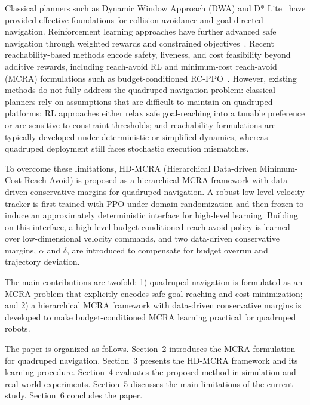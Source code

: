 \documentclass{article}
\begin{document}
Classical planners such as Dynamic Window Approach (DWA) and D* Lite~\citep{fox1997,koenig2002,karaman2011} have provided effective foundations for collision avoidance and goal-directed navigation. Reinforcement learning approaches have further advanced safe navigation through weighted rewards and constrained objectives~\citep{achiam2017,tessler2019,liu2022cvpo,garcia2015,wachi2024,guerrier2024}. Recent reachability-based methods encode safety, liveness, and cost feasibility beyond additive rewards, including reach-avoid RL and minimum-cost reach-avoid (MCRA) formulations such as budget-conditioned RC-PPO~\citep{bansal2017,hsu2021,so2024,ganai2024survey,ganai2023}. However, existing methods do not fully address the quadruped navigation problem: classical planners rely on assumptions that are difficult to maintain on quadruped platforms; RL approaches either relax safe goal-reaching into a tunable preference or are sensitive to constraint thresholds; and reachability formulations are typically developed under deterministic or simplified dynamics, whereas quadruped deployment still faces stochastic execution mismatches.

To overcome these limitations, HD-MCRA (Hierarchical Data-driven Minimum-Cost Reach-Avoid) is proposed as a hierarchical MCRA framework with data-driven conservative margins for quadruped navigation. A robust low-level velocity tracker is first trained with PPO under domain randomization and then frozen to induce an approximately deterministic interface for high-level learning. Building on this interface, a high-level budget-conditioned reach-avoid policy is learned over low-dimensional velocity commands, and two data-driven conservative margins, $\alpha$ and $\delta$, are introduced to compensate for budget overrun and trajectory deviation.

The main contributions are twofold: 1) quadruped navigation is formulated as an MCRA problem that explicitly encodes safe goal-reaching and cost minimization; and 2) a hierarchical MCRA framework with data-driven conservative margins is developed to make budget-conditioned MCRA learning practical for quadruped robots.

The paper is organized as follows. Section~2 introduces the MCRA formulation for quadruped navigation. Section~3 presents the HD-MCRA framework and its learning procedure. Section~4 evaluates the proposed method in simulation and real-world experiments. Section~5 discusses the main limitations of the current study. Section~6 concludes the paper.
\end{document}
